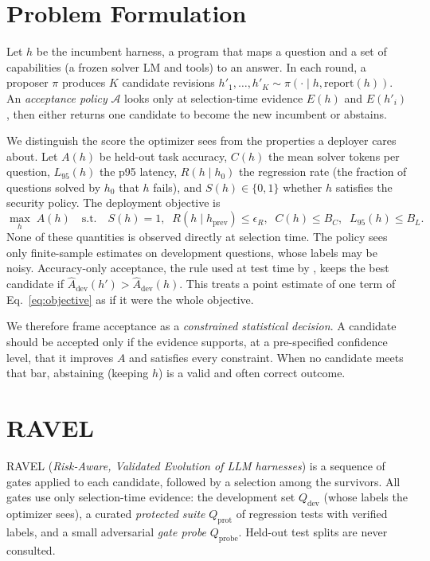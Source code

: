 \section{Problem Formulation}
\label{sec:problem}

Let $h$ be the incumbent harness, a program that maps a question and a set of capabilities (a frozen
solver LM and tools) to an answer. In each round, a proposer $\pi$ produces $K$ candidate revisions
$h'_1,\dots,h'_K \sim \pi(\cdot \mid h, \text{report}(h))$. An \emph{acceptance policy} $\mathcal{A}$
looks only at selection-time evidence $E(h)$ and $E(h'_i)$, then either returns one candidate to become
the new incumbent or abstains.

We distinguish the score the optimizer sees from the properties a deployer cares about. Let $A(h)$ be
held-out task accuracy, $C(h)$ the mean solver tokens per question, $L_{95}(h)$ the p95 latency,
$R(h \mid h_0)$ the regression rate (the fraction of questions solved by $h_0$ that $h$ fails), and
$S(h)\in\{0,1\}$ whether $h$ satisfies the security policy. The deployment objective is
\begin{equation}
\label{eq:objective}
\max_{h}\; A(h) \quad \text{s.t.}\quad S(h)=1,\;\; R(h\mid h_{\text{prev}}) \le \epsilon_R,\;\;
C(h) \le B_C,\;\; L_{95}(h) \le B_L .
\end{equation}
None of these quantities is observed directly at selection time. The policy sees only finite-sample
estimates on development questions, whose labels may be noisy. Accuracy-only acceptance, the rule used
at test time by \citet{zhang2026harnesslearning}, keeps the best candidate if
$\widehat{A}_{\text{dev}}(h') > \widehat{A}_{\text{dev}}(h)$. This treats a point estimate of one term
of Eq.~\eqref{eq:objective} as if it were the whole objective.

We therefore frame acceptance as a \emph{constrained statistical decision}. A candidate should be
accepted only if the evidence supports, at a pre-specified confidence level, that it improves $A$ and
satisfies every constraint. When no candidate meets that bar, abstaining (keeping $h$) is a valid and
often correct outcome.

\section{RAVEL}
\label{sec:method}

RAVEL (\emph{Risk-Aware, Validated Evolution of LLM harnesses}) is a sequence of gates applied to each
candidate, followed by a selection among the survivors. All gates use only selection-time evidence: the
development set $Q_{\text{dev}}$ (whose labels the optimizer sees), a curated \emph{protected suite}
$Q_{\text{prot}}$ of regression tests with verified labels, and a small adversarial \emph{gate probe}
$Q_{\text{probe}}$. Held-out test splits are never consulted.

